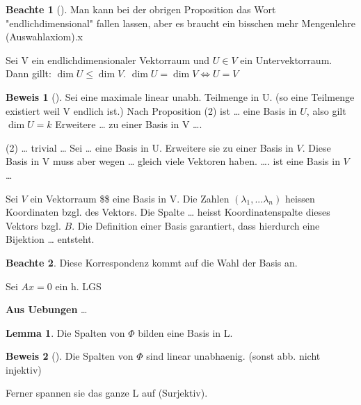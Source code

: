 \documentclass[oneside,fontsize=11pt,paper=a4,BCOR=0mm,DIV=12,automark,headsepline]{scrbook}
\theoremstyle{remark}
\theoremstyle{definition}
\newtheorem*{notte}{Beachte}
\newtheorem{lemma}{Lemma}[section]
\theoremstyle{definition}
\newtheorem*{prof}{Beweis}
\theoremstyle{remark}
\begin{document}
\begin{notte}[] \label{}
Man kann bei der obrigen Proposition das Wort "endlichdimensional" fallen
lassen, aber es braucht ein bisschen mehr Mengenlehre (Auswahlaxiom).x
\end{notte}


\begin{theo}{}{}
Sei V ein endlichdimensionaler Vektorraum und \(U\in V\) ein Untervektorraum. Dann
gillt: \(\dim U \leq \dim V\).  \(\dim U = \dim V \iff U=V\)
\end{theo}

\begin{prof}[] \label{}
Sei eine maximale linear unabh. Teilmenge in U. (so eine Teilmenge existiert
weil V endlich ist.)
Nach Proposition (2) ist \ldots{} eine Basis in \(U\), also gilt \(\dim U = k\) Erweitere
\ldots{} zu einer Basis in V \ldots{}. 

(2) \ldots{} trivial \ldots{} Sei \ldots{} eine Basis in U. Erweitere sie zu einer Basis in
\(V\). Diese Basis in V muss aber wegen \ldots{} gleich viele Vektoren haben. \ldots{}. ist
eine Basis in \(V\) \ldots{}
\end{prof}


\begin{definition}{}{}
Sei \(V\) ein Vektorraum \$\$ eine Basis in V. Die Zahlen \((\lambda_1,...\lambda_n)\)
heissen Koordinaten bzgl. des Vektors. Die Spalte \ldots{} heisst Koordinatenspalte
dieses Vektors bzgl. \(B\).
Die Definition einer Basis garantiert, dass hierdurch eine Bijektion \ldots{} entsteht.
\end{definition}

\begin{notte}
  Diese Korrespondenz kommt auf die Wahl der Basis an.
\end{notte}

\begin{exa} \label{}

\end{exa}

\begin{exa} \label{}
Sei \(Ax=0\) ein h. LGS
\end{exa}

\textbf{Aus Uebungen} \ldots{}

\begin{lemma}
  Die Spalten von \(\Phi\) bilden eine Basis in L.
\end{lemma}
  
\begin{prof}[] \label{}
Die Spalten von \(\Phi\) sind linear unabhaenig. (sonst abb. nicht injektiv)

Ferner spannen sie das ganze L auf (Surjektiv). 
\end{prof}
\end{document}
